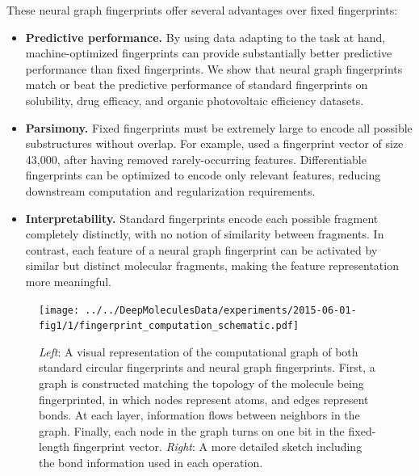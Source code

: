 \documentclass{article}
\begin{document}
These neural graph fingerprints offer several advantages over fixed fingerprints:
\begin{itemize}
\item {\bf Predictive performance.}
By using data adapting to the task at hand, machine-optimized fingerprints can provide substantially better predictive performance than fixed fingerprints.
We show that neural graph fingerprints match or beat the predictive performance of standard fingerprints on 
solubility, drug efficacy, and organic photovoltaic efficiency datasets.
\item {\bf Parsimony.}
Fixed fingerprints must be extremely large to encode all possible substructures without overlap.
For example, \cite{unterthinerdeep} used a fingerprint vector of size 43,000, after having removed rarely-occurring features.
Differentiable fingerprints can be optimized to encode only relevant features, reducing downstream computation and regularization requirements.
\item {\bf Interpretability.}
Standard fingerprints encode each possible fragment completely distinctly, with no notion of similarity between fragments.
In contrast, each feature of a neural graph fingerprint can be activated by similar but distinct molecular fragments, making the feature representation more meaningful.
\end{itemize}

\begin{figure}
\centerline{\texttt{[image: ../../DeepMoleculesData/experiments/2015-06-01-fig1/1/fingerprint\_computation\_schematic.pdf]}
\hspace{5em}
}
\vspace{-1mm}
\caption{\emph{Left}: A visual representation of the computational graph of both standard circular fingerprints and neural graph fingerprints.
First, a graph is constructed matching the topology of the molecule being fingerprinted, in which nodes represent atoms, and edges represent bonds.
At each layer, information flows between neighbors in the graph.
Finally, each node in the graph turns on one bit in the fixed-length fingerprint vector.
\emph{Right}: A more detailed sketch including the bond information used in each operation.}
\label{fig:architecture sketch}
\end{figure}
\end{document}
